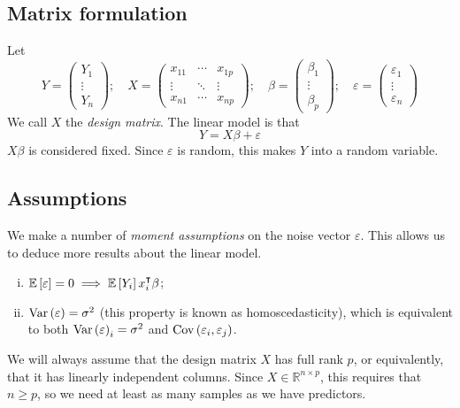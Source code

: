 \subsection{Matrix formulation}
Let
\[ Y = \begin{pmatrix}
	Y_1 \\
	\vdots \\
	Y_n
\end{pmatrix};\quad X = \begin{pmatrix}
	x_{11} & \cdots & x_{1p} \\
	\vdots & \ddots & \vdots \\
	x_{n1} & \cdots & x_{np}
\end{pmatrix};\quad \beta = \begin{pmatrix}
	\beta_1 \\
	\vdots \\
	\beta_p
\end{pmatrix};\quad \varepsilon = \begin{pmatrix}
	\varepsilon_1 \\
	\vdots \\
	\varepsilon_n
\end{pmatrix} \]
We call \( X \) the \textit{design matrix}.
The linear model is that
\[ Y = X\beta + \varepsilon \]
\( X\beta \) is considered fixed.
Since \( \varepsilon \) is random, this makes \( Y \) into a random variable.

\subsection{Assumptions}
We make a number of \textit{moment assumptions} on the noise vector \( \varepsilon \).
This allows us to deduce more results about the linear model.
\begin{enumerate}[(i)]
	\item \( \mathbb{E}\left[{\varepsilon}\right] = 0 \implies \mathbb{E}\left[{Y_i}\right] x_i^\intercal \beta \);
	\item \( \operatorname{Var}\left({\varepsilon}\right) = \sigma^2 \) (this property is known as homoscedasticity), which is equivalent to both \( \operatorname{Var}\left({\varepsilon}\right)_i = \sigma^2 \) and \( \operatorname{Cov}\left({\varepsilon_i, \varepsilon_j}\right) \).
\end{enumerate}
We will always assume that the design matrix \( X \) has full rank \( p \), or equivalently, that it has linearly independent columns.
Since \( X \in \mathbb R^{n \times p} \), this requires that \( n \geq p \), so we need at least as many samples as we have predictors.

